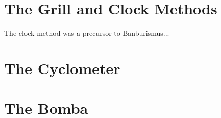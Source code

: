 \section{The Grill and Clock Methods}

The clock method was a precursor to Banburismus...

\section{The Cyclometer}

\section{The Bomba}




